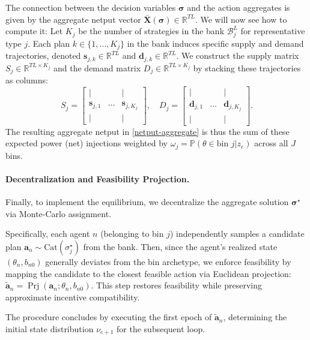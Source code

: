 \documentclass[12pt, notitlepage]{article}
\begin{document}
The connection between the decision variables $\boldsymbol{\sigma}$ and the action aggregates is given by the aggregate netput vector $\bar{\mathbf{X}}(\boldsymbol{\sigma}) \in \mathbb{R}^{TL}$. We will now see how to compute it: Let $K_j$ be the number of strategies in the bank $\mathcal{B}_j^L$ for representative type $j$.
Each plan $k \in \{1, \dots, K_j\}$ in the bank induces specific supply and demand trajectories, denoted $\mathbf{s}_{j,k} \in \mathbb{R}^{TL}$ and $\mathbf{d}_{j,k} \in \mathbb{R}^{TL}$. We construct the supply matrix $S_j \in \mathbb{R}^{TL \times K_j}$ and the demand matrix $D_j \in \mathbb{R}^{TL \times K_j}$ by stacking these trajectories as columns:
\[
S_j = \begin{bmatrix} | & & | \\ \mathbf{s}_{j,1} & \dots & \mathbf{s}_{j,K_j} \\ | & & | \end{bmatrix}, \quad
D_j = \begin{bmatrix} | & & | \\ \mathbf{d}_{j,1} & \dots & \mathbf{d}_{j,K_j} \\ | & & | \end{bmatrix}.
\] 
The resulting aggregate netput in \cref{netput-aggregate} is thus the sum of these expected power (net) injections weighted by $\omega_j = \mathbb{P}(\theta \in \text{bin } j | z_e)$ across all $J$ bins.


\paragraph{Decentralization and Feasibility Projection.}
Finally, to implement the equilibrium, we decentralize the aggregate solution $\boldsymbol{\sigma}^\star$ via Monte-Carlo assignment. 

Specifically, each agent $n$ (belonging to bin $j$) independently samples a candidate plan $\mathbf{a}_{n} \sim \mathrm{Cat}(\sigma_j^\star)$ from the bank. Then, since the agent's realized state $(\theta_n, b_{n0})$ generally deviates from the bin archetype, we enforce feasibility by mapping the candidate to the closest feasible action via Euclidean projection: $\widetilde{\mathbf{a}}_n = \operatorname{Prj}(\mathbf{a}_{n}; \theta_n, b_{n0})$. This step restores feasibility while preserving approximate incentive compatibility. 

The procedure concludes by executing the first epoch of $\widetilde{\mathbf{a}}_n$, determining the initial state distribution $\nu_{e+1}$ for the subsequent loop.
\end{document}
